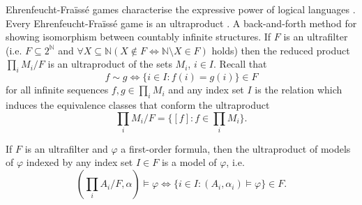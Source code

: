 Ehrenfeucht-Fra\"iss\'e games characterise the expressive power of logical languages \cite{ams}. Every Ehrenfeucht-Fra\"iss\'e game is an ultraproduct \cite{models}. A back-and-forth method for showing isomorphism between countably infinite structures. If $F$ is an ultrafilter (i.e. $F\subseteq 2^{\mathbb{N}}$ and $\forall X\subseteq\mathbb{N} (X\notin F \Leftrightarrow \mathbb{N}\setminus X\in F)$ holds) then the reduced product $\prod_{i}M_i / F$ is an ultraproduct of the sets $M_i$, $i\in I$. Recall that \[f\sim g \Leftrightarrow \{i\in I : f(i) = g(i)\}\in F\] for all infinite sequences $f,g\in\prod_i M_i$ and any index set $I$ is the relation which induces the equivalence classes that conform the ultraproduct \[\prod_{i}M_i / F = \{[f]:f\in\prod_i M_i\}.\] 

\begin{lem}
If $F$ is an ultrafilter and $\varphi$ a first-order formula, then the ultraproduct of models of $\varphi$ indexed by any index set $I\in F$ is a model of $\varphi$, i.e. \[(\prod_i A_i / F , \alpha)\models\varphi\Leftrightarrow\{i\in I: (A_i, \alpha_i)\models\varphi\}\in F.\]
\end{lem}


\nocite{*}




